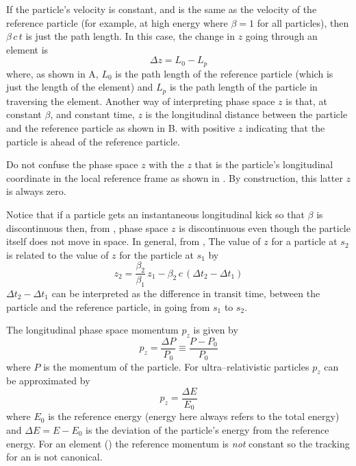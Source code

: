 If the particle's velocity is constant, and is the same as the velocity of the reference particle
(for example, at high energy where $\beta = 1$ for all particles), then $\beta \, c \, t$ is just
the path length. In this case, the change in $z$ going through an element is
\begin{equation}
  \Delta z = L_0 - L_p
\end{equation}
where, as shown in A, $L_0$ is the path length of the reference particle (which
is just the length of the element) and $L_p$ is the path length of the particle in traversing the
element.  Another way of interpreting phase space $z$ is that, at constant $\beta$, and constant
time, $z$ is the longitudinal distance between the particle and the reference particle as shown in
B. with positive $z$ indicating that the particle is ahead of the reference
particle.

Do not confuse the phase space $z$ with the $z$ that is the particle's longitudinal coordinate in
the local reference frame as shown in . By construction, this latter $z$ is
always zero.

Notice that if a particle gets an instantaneous longitudinal kick so that $\beta$ is discontinuous
then, from , phase space $z$ is discontinuous even though the particle itself does not
move in space. In general, from , The value of $z$ for a particle at $s_2$ is related to
the value of $z$ for the particle at $s_1$ by
\begin{equation}
  z_2 = \frac{\beta_2}{\beta_1} \, z_1 - 
  \beta_2 \, c \, (\Delta t_2 - \Delta t_1)
  \label{zbbzb}
\end{equation}
$\Delta t_2 - \Delta t_1$ can be interpreted as the difference in transit time, between the particle
and the reference particle, in going from $s_1$ to $s_2$.

The longitudinal phase space momentum $p_z$ is given by
\begin{equation}
  p_z = \frac{\Delta P}{P_0} \equiv \frac{P - P_0}{P_0}
  \label{ppppp}
\end{equation}
where $P$ is the momentum of the particle. For ultra--relativistic particles $p_z$ can be
approximated by
\begin{equation}
  p_z = \frac{\Delta E}{E_0}
\end{equation}
where $E_0$ is the reference energy (energy here always refers to the total energy) and $\Delta E =
E - E_0$ is the deviation of the particle's energy from the reference energy. For an 
element () the reference momentum is {\it not} constant so the tracking for an
 is not canonical.

